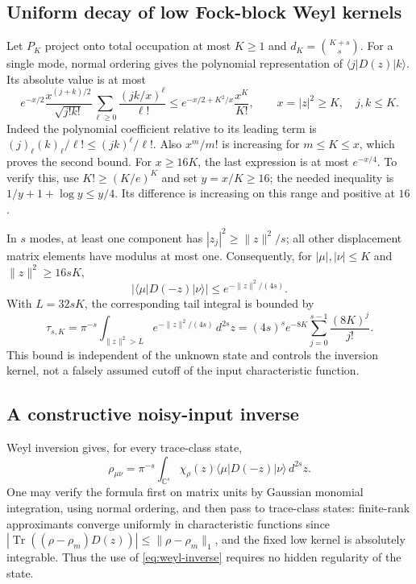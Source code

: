 \documentclass[11pt,a4paper]{article}
\numberwithin{equation}{section}
\begin{document}
\subsection{Uniform decay of low Fock-block Weyl kernels}
Let $P_K$ project onto total occupation at most $K\ge1$ and
$d_K=\binom{K+s}{s}$. For a single mode, normal ordering gives the polynomial
representation of $\langle j|D(z)|k\rangle$. Its absolute value is at most
\[
 e^{-x/2}\frac{x^{(j+k)/2}}{\sqrt{j!k!}}
       \sum_{\ell\ge0}\frac{(jk/x)^\ell}{\ell!}
 \le e^{-x/2+K^2/x}\frac{x^K}{K!},\qquad
 x=|z|^2\ge K,\quad j,k\le K.
 \tag{D.4}\label{eq:weyl-low-kernel}
\]
Indeed the polynomial coefficient relative to its leading term is
$(j)_\ell(k)_\ell/\ell!\le(jk)^\ell/\ell!$. Also $x^m/m!$ is increasing
for $m\le K\le x$, which proves the second bound.
For $x\ge16K$, the last expression is at most $e^{-x/4}$.
To verify this, use $K!\ge(K/e)^K$ and set $y=x/K\ge16$; the needed
inequality is $1/y+1+\log y\le y/4$. Its difference is increasing on this
range and positive at $16$.

In $s$ modes, at least one component has $|z_j|^2\ge\|z\|^2/s$; all other
displacement matrix elements have modulus at most one. Consequently, for
$|\mu|,|\nu|\le K$ and $\|z\|^2\ge16sK$,
\[
 |\langle\mu|D(-z)|\nu\rangle|\le e^{-\|z\|^2/(4s)}.
 \tag{D.5}\label{eq:weyl-tail}
\]
With $L=32sK$, the corresponding tail integral is bounded by
\[
 \tau_{s,K}=\pi^{-s}\int_{\|z\|^2>L}e^{-\|z\|^2/(4s)}\,d^{2s}z
 =(4s)^s e^{-8K}\sum_{j=0}^{s-1}\frac{(8K)^j}{j!}.
 \tag{D.6}\label{eq:weyl-tail-integral}
\]
This bound is independent of the unknown state and controls the inversion
kernel, not a falsely assumed cutoff of the input characteristic function.

\subsection{A constructive noisy-input inverse}
Weyl inversion gives, for every trace-class state,
\[
 \rho_{\mu\nu}=\pi^{-s}\int_{\mathbb C^s}
       \chi_\rho(z)\langle\mu|D(-z)|\nu\rangle\,d^{2s}z.
 \tag{D.7}\label{eq:weyl-inverse}
\]
One may verify the formula first on matrix units by Gaussian monomial
integration, using normal ordering, and then pass to trace-class states:
finite-rank approximants converge uniformly in characteristic functions
since $|\operatorname{Tr}((\rho-\rho_m)D(z))|\le\|\rho-\rho_m\|_1$,
and the fixed low kernel is absolutely integrable. Thus the use of
\eqref{eq:weyl-inverse} requires no hidden regularity of the state.
\end{document}
